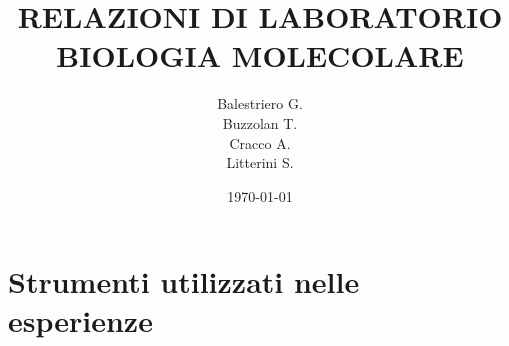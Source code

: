\documentclass{report}
\begin{document}
	\title{RELAZIONI DI LABORATORIO\\BIOLOGIA MOLECOLARE}

	\author{Balestriero G.\\Buzzolan T.\\Cracco A.\\Litterini S. }

	\date{\today}

	\maketitle

	\vspace{1.5cm}

	\tableofcontents


	\newpage

	\chapter*{Strumenti utilizzati nelle esperienze}

	\renewcommand*\thesection{\arabic{section}}


		\vspace{0.5cm}
\end{document}
